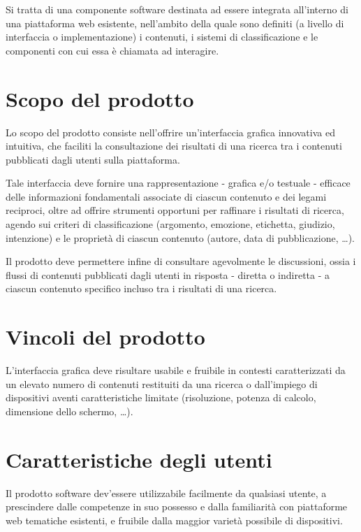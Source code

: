 \documentclass[10pt,a4paper,headinclude,footinclude,hidelinks]{scrreprt} %
\begin{document}
	Si tratta di una componente software destinata ad essere integrata all'interno di una piattaforma web esistente, nell'ambito della quale sono definiti (a livello di interfaccia o implementazione) i contenuti, i sistemi di classificazione e le componenti con cui essa è chiamata ad interagire.

	\section{Scopo del prodotto}
	\label{sec:stage:ar:intro:scopo}
	Lo scopo del prodotto consiste nell'offrire un'interfaccia grafica innovativa ed intuitiva, che faciliti la consultazione dei risultati di una ricerca tra i contenuti pubblicati dagli utenti sulla piattaforma.

	Tale interfaccia deve fornire una rappresentazione - grafica e/o testuale - efficace delle informazioni fondamentali associate di ciascun contenuto e dei legami reciproci, oltre ad offrire strumenti opportuni per raffinare i risultati di ricerca, agendo sui criteri di classificazione (argomento, emozione, etichetta, giudizio, intenzione) e le proprietà di ciascun contenuto (autore, data di pubblicazione, \ldots).

	Il prodotto deve permettere infine di consultare agevolmente le discussioni, ossia i flussi di contenuti pubblicati dagli utenti in risposta - diretta o indiretta - a ciascun contenuto specifico incluso tra i risultati di una ricerca.

	\section{Vincoli del prodotto}
	\label{sec:stage:ar:intro:vincoli}
	L'interfaccia grafica deve risultare usabile e fruibile in contesti caratterizzati da un elevato numero di contenuti restituiti da una ricerca o dall'impiego di dispositivi aventi caratteristiche limitate (risoluzione, potenza di calcolo, dimensione dello schermo, \ldots).

	\section{Caratteristiche degli utenti}
	\label{sec:stage:ar:intro:utenti}
	Il prodotto software dev'essere utilizzabile facilmente da qualsiasi utente, a prescindere dalle competenze in suo possesso e dalla familiarità con piattaforme web tematiche esistenti, e fruibile dalla maggior varietà possibile di dispositivi.
\end{document}
